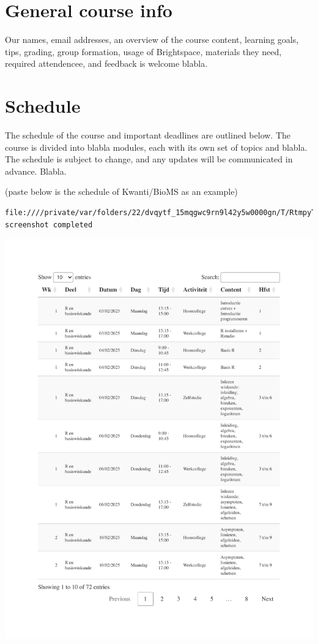 \documentclass[
  letterpaper,
  DIV=11,
  numbers=noendperiod]{scrreprt}
\theoremstyle{definition}
\theoremstyle{remark}
\begin{document}
\chapter{General course info}\label{general}

Our names, email addresses, an overview of the course content, learning
goals, tips, grading, group formation, usage of Brightspace, materials
they need, required attendencee, and feedback is welcome blabla.

\chapter{Schedule}\label{modelling}

The schedule of the course and important deadlines are outlined below.
The course is divided into blabla modules, each with its own set of
topics and blabla. The schedule is subject to change, and any updates
will be communicated in advance. Blabla.

(paste below is the schedule of Kwanti/BioMS as an example)

\begin{verbatim}
file:////private/var/folders/22/dvqytf_15mqgwc9rn9l42y5w0000gn/T/RtmpyTgHQy/file7b6f4bc0af09/widget7b6f57239eb9.html screenshot completed
\end{verbatim}

\includegraphics{schedule_files/figure-pdf/unnamed-chunk-1-1.pdf}
\end{document}
